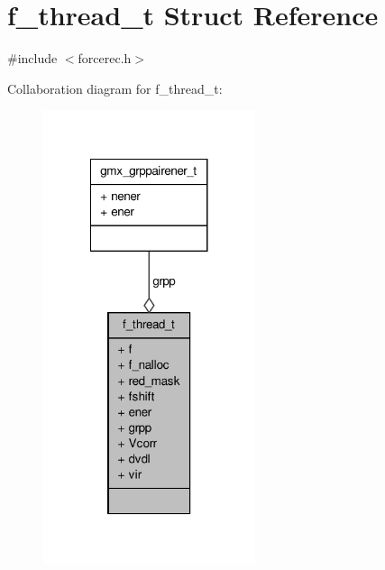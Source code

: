 \hypertarget{structf__thread__t}{\section{f\-\_\-thread\-\_\-t \-Struct \-Reference}
\label{structf__thread__t}
}


{\ttfamily \#include $<$forcerec.\-h$>$}



\-Collaboration diagram for f\-\_\-thread\-\_\-t\-:
\nopagebreak
\begin{figure}[H]
\begin{center}
\leavevmode
\includegraphics[width=176pt]{structf__thread__t__coll__graph}
\end{center}
\end{figure}
